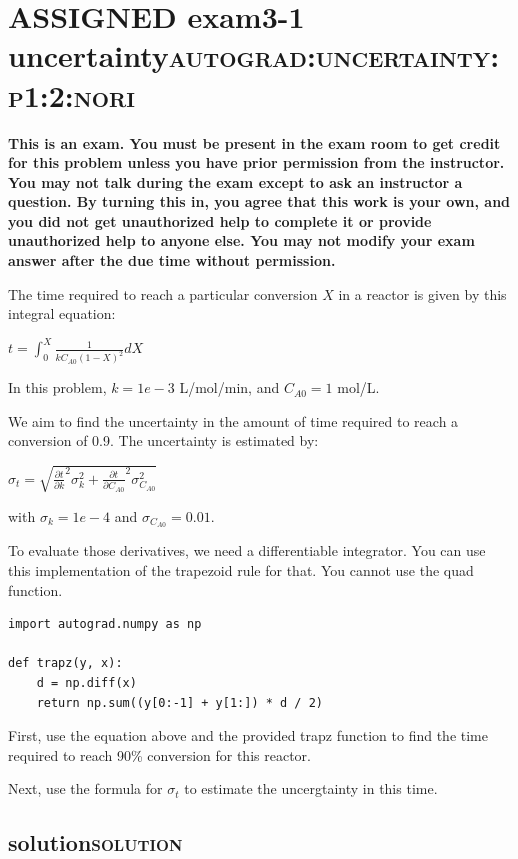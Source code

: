 \documentclass[11pt]{article}
\date{\today}
\title{}
\begin{document}
\tableofcontents

\section{{\bfseries\sffamily ASSIGNED} exam3-1 uncertainty\hfill{}\textsc{autograd:uncertainty:p1:2:nori}}
\label{sec:org33ba6c0}
\textbf{This is an exam. You must be present in the exam room to get credit for this problem unless you have prior permission from the instructor. You may not talk during the exam except to ask an instructor a question. By turning this in, you agree that this work is your own, and you did not get unauthorized help to complete it or provide unauthorized help to anyone else. You may not modify your exam answer after the due time without permission.}

The time required to reach a particular conversion \(X\) in a reactor is given by this integral equation:

\(t = \int_0^X \frac{1}{k C_{A0} (1 - X)^2} dX\)

In this problem, \(k = 1e-3\) L/mol/min, and \(C_{A0} = 1\) mol/L.

We aim to find the uncertainty in the amount of time required to reach a conversion of 0.9. The uncertainty is estimated by:

\(\sigma_t = \sqrt{\frac{\partial t}{\partial k}^2 \sigma_k^2 + \frac{\partial t}{\partial C_{A0}}^2 \sigma_{C_{A0}}^2 }\)

with \(\sigma_k = 1e-4\) and \(\sigma_{C_{A0}} = 0.01\).

To evaluate those derivatives, we need a differentiable integrator. You can use this implementation of the trapezoid rule for that. You cannot use the quad function.

\begin{verbatim}
import autograd.numpy as np

def trapz(y, x):
    d = np.diff(x)
    return np.sum((y[0:-1] + y[1:]) * d / 2)
\end{verbatim}

First, use the equation above and the provided trapz function to find the time required to reach 90\% conversion for this reactor.

Next, use the formula for \(\sigma_t\) to estimate the uncergtainty in this time.


\subsection{solution\hfill{}\textsc{solution}}
\label{sec:orgf854c59}
\end{document}

